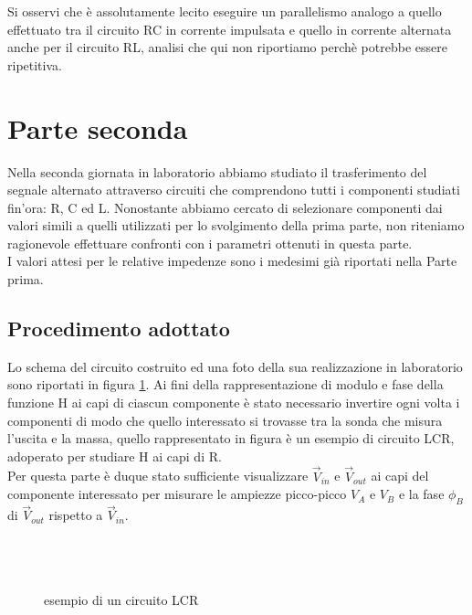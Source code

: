 \documentclass{article}
\theoremstyle{definition}
\begin{document}
\noindent Si osservi che è assolutamente lecito eseguire un parallelismo analogo a quello effettuato tra il circuito RC in corrente impulsata e quello in corrente alternata anche per il circuito RL, analisi che qui non riportiamo perchè potrebbe essere ripetitiva. 

\section{Parte seconda}
Nella seconda giornata in laboratorio abbiamo studiato il trasferimento del segnale alternato attraverso circuiti che comprendono tutti i componenti studiati fin'ora: R, C ed L. Nonostante abbiamo cercato di selezionare componenti dai valori simili a quelli utilizzati per lo svolgimento della prima parte, non riteniamo ragionevole effettuare confronti con i parametri ottenuti in questa parte. \\
I valori attesi per le relative impedenze sono i medesimi già riportati nella Parte prima. 

\subsection{Procedimento adottato}
Lo schema del circuito costruito ed una foto della sua realizzazione in laboratorio sono riportati in figura \ref{fig:RCL-schema-e-foto}. Ai fini della rappresentazione di modulo e fase della funzione H ai capi di ciascun componente è stato necessario invertire ogni volta i componenti di modo che quello interessato si trovasse tra la sonda che misura l'uscita e la massa, quello rappresentato in figura è un esempio di circuito LCR, adoperato per studiare H ai capi di R. \\
\noindent Per questa parte è duque stato sufficiente visualizzare \(\vec{V}_{in}\) e \(\vec{V}_{out}\) ai capi del componente interessato per misurare le ampiezze picco-picco \(V_{A}\) e \(V_{B}\) e la fase \(\phi_{B}\) di \(\vec{V}_{out}\) rispetto a \(\vec{V}_{in}\).  \\\\\\\\

\begin{figure}[!h]
\caption{esempio di un circuito LCR}

\label{fig:RCL-schema-e-foto}
\end{figure}
\end{document}
